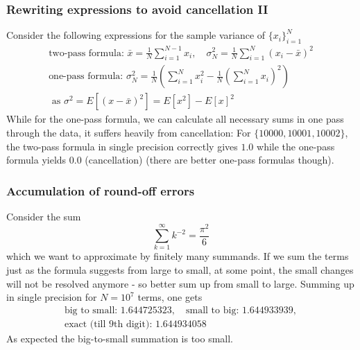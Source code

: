 \subsubsection{Rewriting expressions to avoid cancellation II}
Consider the following expressions for the sample variance of $\{x_i\}_{i=1}^N$
\begin{equation}
    \begin{multlined}
        \text{two-pass formula: } \bar{x} = \frac{1}{N} \sum_{i=1}^{N-1} x_i, \quad \sigma^2_N = \frac{1}{N} \sum_{i=1}^N (x_i - \bar{x})^2 \\ \text{one-pass formula: } \sigma^2_N = \frac{1}{N} \left( \sum_{i=1}^N x_i^2 - \frac{1}{N} \left( \sum_{i=1}^N x_i \right)^2 \right) \\ \text{ as } \sigma^2 = E[(x-\bar{x})^2] = E[x^2] - E[x]^2
    \end{multlined}
\end{equation}
While for the one-pass formula, we can calculate all necessary sums in one pass through the data, it suffers heavily from cancellation: For $\{10000,10001,10002\}$, the two-pass formula in single precision correctly gives $1.0$ while the one-pass formula yields $0.0$ (cancellation) (there are better one-pass formulas though).

\subsubsection{Accumulation of round-off errors}
Consider the sum
\begin{equation}
    \sum_{k=1}^\infty k^{-2} = \frac{\pi^2}{6}
\end{equation}
which we want to approximate by finitely many summands. If we sum the terms
just as the formula suggests from large to small, at some point, the small changes will not be resolved anymore - so better
sum up from small to large. Summing up in single precision for $N=10^7$ terms, one gets
\begin{equation}
    \begin{multlined}
        \text{big to small: } 1.644725323, \quad \text{small to big: } 1.644933939, \\ \text{exact (till 9th digit): } 1.644934058
    \end{multlined}
\end{equation}
As expected the big-to-small summation is too small.

